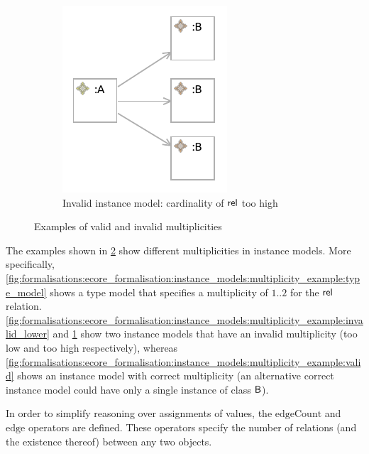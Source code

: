 \begin{figure}
\begin{subfigure}{0.3\textwidth}
        \includegraphics{images/03_formalisations/02_ecore_formalisation/multiplicities/invalid_upper.pdf}
        \caption{Invalid instance model: cardinality of $\mathsf{rel}$ too high}
        \label{fig:formalisations:ecore_formalisation:instance_models:multiplicity_example:invalid_upper}
    \end{subfigure}
    \caption{Examples of valid and invalid multiplicities}
    \label{fig:formalisations:ecore_formalisation:instance_models:multiplicity_example}
\end{figure}

The examples shown in \cref{fig:formalisations:ecore_formalisation:instance_models:multiplicity_example} show different multiplicities in instance models. More specifically, \cref{fig:formalisations:ecore_formalisation:instance_models:multiplicity_example:type_model} shows a type model that specifies a multiplicity of $1..2$ for the $\mathsf{rel}$ relation. \cref{fig:formalisations:ecore_formalisation:instance_models:multiplicity_example:invalid_lower} and \cref{fig:formalisations:ecore_formalisation:instance_models:multiplicity_example:invalid_upper} show two instance models that have an invalid multiplicity (too low and too high respectively), whereas \cref{fig:formalisations:ecore_formalisation:instance_models:multiplicity_example:valid} shows an instance model with correct multiplicity (an alternative correct instance model could have only a single instance of class $\mathsf{B}$).

In order to simplify reasoning over assignments of values, the $\mathrm{edgeCount}$ and $\mathrm{edge}$ operators are defined. These operators specify the number of relations (and the existence thereof) between any two objects.

